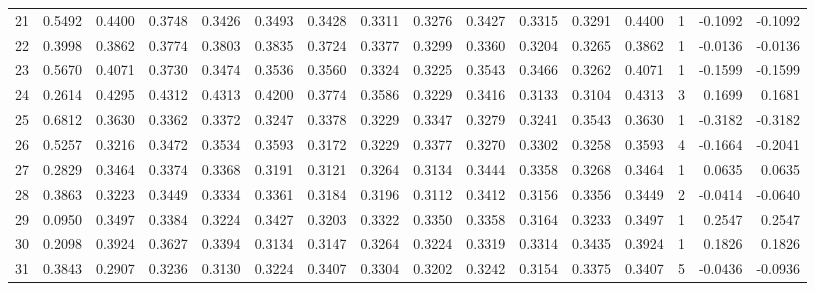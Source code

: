 \begin{tabular}{lrrrrrrrrrrrrrrr}
21  &      0.5492 &  0.4400 &  0.3748 &  0.3426 &  0.3493 &  0.3428 &  0.3311 &  0.3276 &  0.3427 &  0.3315 &   0.3291 &     0.4400 &      1 &                   -0.1092 &                    -0.1092 \\
22  &      0.3998 &  0.3862 &  0.3774 &  0.3803 &  0.3835 &  0.3724 &  0.3377 &  0.3299 &  0.3360 &  0.3204 &   0.3265 &     0.3862 &      1 &                   -0.0136 &                    -0.0136 \\
23  &      0.5670 &  0.4071 &  0.3730 &  0.3474 &  0.3536 &  0.3560 &  0.3324 &  0.3225 &  0.3543 &  0.3466 &   0.3262 &     0.4071 &      1 &                   -0.1599 &                    -0.1599 \\
24  &      0.2614 &  0.4295 &  0.4312 &  0.4313 &  0.4200 &  0.3774 &  0.3586 &  0.3229 &  0.3416 &  0.3133 &   0.3104 &     0.4313 &      3 &                    0.1699 &                     0.1681 \\
25  &      0.6812 &  0.3630 &  0.3362 &  0.3372 &  0.3247 &  0.3378 &  0.3229 &  0.3347 &  0.3279 &  0.3241 &   0.3543 &     0.3630 &      1 &                   -0.3182 &                    -0.3182 \\
26  &      0.5257 &  0.3216 &  0.3472 &  0.3534 &  0.3593 &  0.3172 &  0.3229 &  0.3377 &  0.3270 &  0.3302 &   0.3258 &     0.3593 &      4 &                   -0.1664 &                    -0.2041 \\
27  &      0.2829 &  0.3464 &  0.3374 &  0.3368 &  0.3191 &  0.3121 &  0.3264 &  0.3134 &  0.3444 &  0.3358 &   0.3268 &     0.3464 &      1 &                    0.0635 &                     0.0635 \\
28  &      0.3863 &  0.3223 &  0.3449 &  0.3334 &  0.3361 &  0.3184 &  0.3196 &  0.3112 &  0.3412 &  0.3156 &   0.3356 &     0.3449 &      2 &                   -0.0414 &                    -0.0640 \\
29  &      0.0950 &  0.3497 &  0.3384 &  0.3224 &  0.3427 &  0.3203 &  0.3322 &  0.3350 &  0.3358 &  0.3164 &   0.3233 &     0.3497 &      1 &                    0.2547 &                     0.2547 \\
30  &      0.2098 &  0.3924 &  0.3627 &  0.3394 &  0.3134 &  0.3147 &  0.3264 &  0.3224 &  0.3319 &  0.3314 &   0.3435 &     0.3924 &      1 &                    0.1826 &                     0.1826 \\
31  &      0.3843 &  0.2907 &  0.3236 &  0.3130 &  0.3224 &  0.3407 &  0.3304 &  0.3202 &  0.3242 &  0.3154 &   0.3375 &     0.3407 &      5 &                   -0.0436 &                    -0.0936 \\

\end{tabular}
